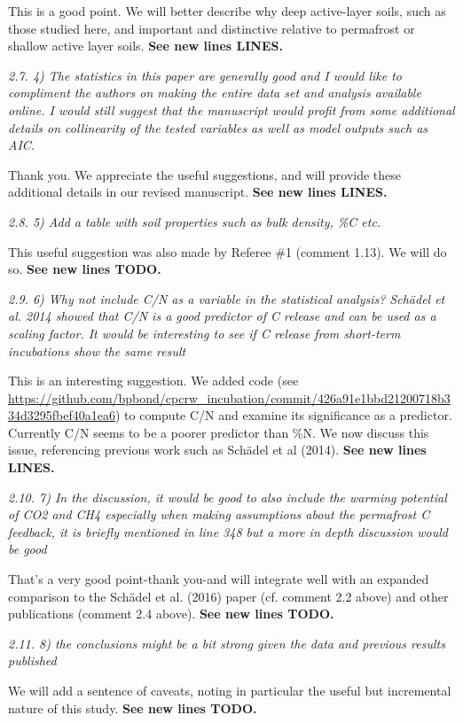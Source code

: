 \documentclass[11pt, oneside]{article}
\begin{document}
This is a good point. We will better describe why deep active-layer soils, such as those studied here, and important and distinctive relative to permafrost or shallow active layer soils.  {\bf See new lines LINES.}

\medskip
{\it 2.7. 4) The statistics in this paper are generally good and I would like to compliment the authors on making the entire data set and analysis available online. I would still suggest that the manuscript would profit from some additional details on collinearity of the tested variables as well as model outputs such as AIC. }

Thank you. We appreciate the useful suggestions, and will provide these additional details in our revised manuscript. {\bf See new lines LINES.}

\medskip
{\it 2.8. 5) Add a table with soil properties such as bulk density, \%C etc. }

This useful suggestion was also made by Referee \#1 (comment 1.13). We will do so. {\bf See new lines TODO.}

\medskip
{\it 2.9. 6) Why not include C/N as a variable in the statistical analysis? Schädel et al. 2014 showed that C/N is a good predictor of C release and can be used as a scaling factor. It would be interesting to see if C release from short-term incubations show the same result }

This is an interesting suggestion. We added code (see \url{https://github.com/bpbond/cpcrw_incubation/commit/426a91e1bbd21200718b334d3295fbef40a1ea6}) to compute C/N and examine its significance as a predictor. Currently C/N seems to be a poorer predictor than \%N. We now discuss this issue, referencing previous work such as Schädel et al (2014). {\bf See new lines LINES.}

\medskip
{\it 2.10. 7) In the discussion, it would be good to also include the warming potential of CO2 and CH4 especially when making assumptions about the permafrost C feedback, it is briefly mentioned in line 348 but a more in depth discussion would be good }

That's a very good point-thank you-and will integrate well with an expanded comparison to the Schädel et al. (2016) paper (cf. comment 2.2 above) and other publications (comment 2.4 above). {\bf See new lines TODO.}

\medskip
{\it 2.11. 8) the conclusions might be a bit strong given the data and previous results published }

We will add a sentence of caveats, noting in particular the useful but incremental nature of this study. {\bf See new lines TODO.}
\end{document}
